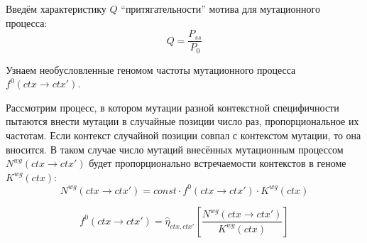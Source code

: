 \documentclass[a4paper]{article}
\begin{document}
Введём характеристику $Q$ ``притягательности'' мотива для мутационного процесса:
\begin{equation}
	Q = \frac{P_{ss}}{P_0}
\end{equation}



Узнаем необусловленные геномом частоты мутационного процесса $f^0(ctx \to ctx')$.

Рассмотрим процесс, в котором мутации разной контекстной специфичности пытаются внести мутации в случайные позиции число раз, пропорциональное их частотам. Если контекст случайной позиции совпал с контекстом мутации, то она вносится. В таком случае число мутаций внесённых мутационным процессом $N^{wg}(ctx \to ctx')$ будет пропорционально встречаемости контекстов в геноме $K^{wg}(ctx)$:
\begin{equation}
	N^{wg}(ctx \to ctx') = const \cdot f^0(ctx \to ctx') \cdot K^{wg}(ctx)
\end{equation}

\begin{equation}
	f^0(ctx \to ctx') = \widehat{\eta}_{ctx, ctx'}\left[ \frac{ N^{wg}(ctx \to ctx') }{ K^{wg}(ctx) }\right]
\end{equation}





\end{document}
